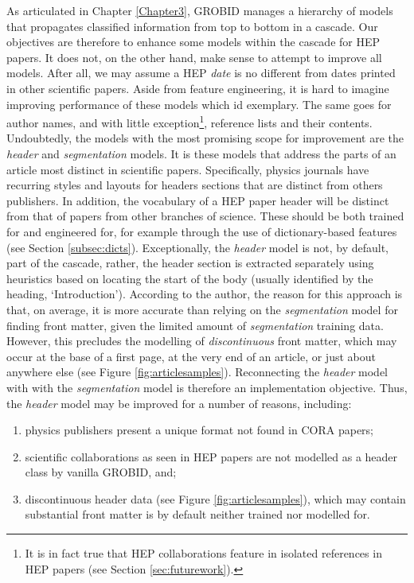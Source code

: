 As articulated in Chapter \ref{Chapter3}, GROBID manages a hierarchy of models that propagates classified information from top to bottom in a cascade. Our objectives are therefore to enhance some models within the cascade for HEP papers. It does not, on the other hand, make sense to attempt to improve all models. After all, we may assume a HEP \emph{date} is no different from dates printed in other scientific papers. Aside from feature engineering, it is hard to imagine improving performance of these models which id exemplary. The same goes for author names, and with little exception\footnote{It is in fact true that HEP collaborations feature in isolated references in HEP papers (see Section \ref{sec:futurework}).}, reference lists and their contents. Undoubtedly, the models with the most promising scope for improvement are the \emph{header} and \emph{segmentation} models. It is these models that address the parts of an article most distinct in scientific papers. Specifically, physics journals have recurring styles and layouts for headers sections that are distinct from others publishers. In addition, the vocabulary of a HEP paper header will be distinct from that of papers from other branches of science. These should be both trained for and engineered for, for example through the use of dictionary-based features (see Section \ref{subsec:dicts}). Exceptionally, the \emph{header} model is not, by default, part of the cascade, rather, the header section is extracted separately using heuristics based on locating the start of the body (usually identified by the heading, `Introduction'). According to the author, the reason for this approach is that, on average, it is more accurate than relying on the \emph{segmentation} model for finding front matter, given the limited amount of \emph{segmentation} training data. However, this precludes the modelling of \emph{discontinuous} front matter, which may occur at the base of a first page, at the very end of an article, or just about anywhere else (see Figure \ref{fig:articlesamples}). Reconnecting the \emph{header} model with with the \emph{segmentation} model is therefore an implementation objective. Thus, the \emph{header} model may be improved for a number of reasons, including:

\begin{enumerate}
\item physics publishers present a unique format not found in CORA papers;
\item scientific collaborations as seen in HEP papers are not modelled as a header class by vanilla GROBID, and;
\item discontinuous header data (see Figure \ref{fig:articlesamples}), which may contain substantial front matter is by default neither trained nor modelled for.
\end{enumerate}

